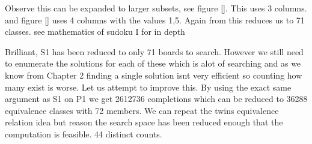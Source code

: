 \documentclass[a4paper,11pt]{report}
\newcounter{row}
\newcounter{col}
\newcounter{rowb}
\newcounter{colb}
\newcommand\setrowb[3]{
  \setcounter{colb}{1}
  \foreach \n in {#1, #2, #3} {
    \edef\x{\value{colb} - 0.5}
    \edef\y{3.5 - \value{rowb}}
    \node[anchor=center] at (\x, \y) {\n};
    \stepcounter{colb}
  }
  \stepcounter{rowb}
}
\begin{document}
Observe this can be expanded to larger subsets, see figure \ref{}. This uses 3 columns. and figure \ref{} uses 4 columns with the values 1,5. Again from \cite{} this reduces us to 71 classes. see mathematics of sudoku I for in depth

\begin{figure}[h!]
\centering
{}
\caption{\label{fig:twins}}
\end{figure}

\begin{figure}[h!]
\centering
{}
\caption{\label{fig:twins}}
\end{figure}

Brilliant, S1 has been reduced to only 71 boards to search. However we still need to enumerate the solutions for each of these which is alot of searching and as we know from Chapter 2 finding a single solution isnt very efficient so counting how many exist is worse. Let us attempt to improve this. By using the exact same argument as S1 on P1 we get 2612736 completions which can be reduced to 36288 equivalence classes with 72 members. We can repeat the twins equivalence relation idea but \cite{} reason the search space has been reduced enough that the computation is feasible. 44 distinct counts.
\end{document}
